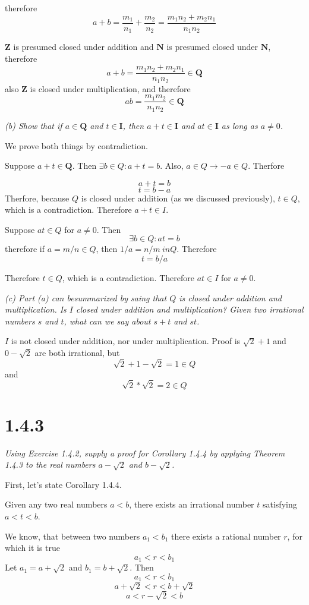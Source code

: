 \documentclass[11pt,oneside,titlepage]{book}
\begin{document}
therefore
$$a + b = \frac{m_1}{n_1} + \frac{m_2}{n_2} =
\frac{m_1 n_2 + m_2 n_1}{n_1 n_2}$$

$\textbf{Z}$ is presumed closed under addition and $\textbf{N}$ is presumed
closed under $\textbf{N}$, therefore 
$$ a + b = \frac{m_1 n_2 + m_2 n_1}{n_1 n_2} \in \textbf{Q}$$
also $\textbf{Z}$ is closed under multiplication, and therefore
$$ a  b = \frac{m_1 m_2}{n_1 n_2} \in \textbf{Q}$$

\textit{(b) Show that if $a \in \textbf{Q}$ and $t \in \textbf{I}$, then
  $a + t \in \textbf{I}$ and $at \in \textbf{I}$ as long as $a \neq 0$.}

We prove both things by contradiction.

Suppose $a + t \in \textbf{Q}$. Then $\exists b \in Q: a + t = b$. Also,
$a \in Q \to -a \in Q$. Therfore

$$a + t = b$$
$$t = b - a$$
Therfore, because $Q$ is closed under addition (as we discussed previously),
$t \in Q$, which is a contradiction. Therefore $a + t \in I$.

Suppose $at \in Q$ for $a \neq 0$. Then
$$\exists b \in Q: at = b $$
therefore if $a = m/n \in Q$, then $1/a = n / m \ in Q$. Therefore
$$t = b/a$$

Therefore $t \in Q$, which is a contradiction. Therefore $at \in I$ for
$a \neq 0$.

\textit{(c) Part (a) can besummarized by saing that $Q$ is closed under
  addition and multiplication. Is $I$ closed under addition and
  multiplication? Given two irrational numbers $s$ and $t$, what can we say
  about $s + t$ and $st$.}

$I$ is not closed under addition, nor under multiplication. Proof is
$\sqrt{2} + 1$ and $0 - \sqrt{2}$ are both irrational, but
$$\sqrt{2} + 1 - \sqrt{2} = 1 \in Q$$
and
$$\sqrt{2} * \sqrt{2} = 2 \in Q$$

\section*{1.4.3}
\textit{Using Exercise 1.4.2, supply a proof for Corollary 1.4.4 by
  applying Theorem 1.4.3 to the real numbers $a - \sqrt{2}$  and
  $b - \sqrt{2}$.}

First, let's state Corollary 1.4.4.

Given any two real numbers $a < b$, there exists an irrational number $t$
satisfying $a < t < b$.

We know, that between two numbers $a_1 < b_1$ there exists a rational number
$r$, for which it is true
$$a_1 < r < b_1$$
Let $a_1 = a + \sqrt{2}$ and $b_1 = b + \sqrt{2}$. Then
$$a_1 < r < b_1$$
$$a + \sqrt{2}  < r < b + \sqrt{2}$$
$$a  < r - \sqrt{2} < b $$
\end{document}
